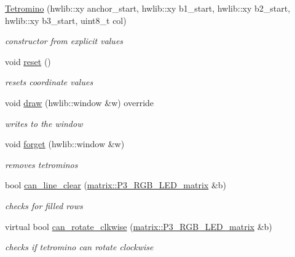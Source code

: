 \begin{DoxyCompactItemize}
\item 
\hyperlink{classtetris_1_1Tetromino_a2fd9a4c170a10eeba329abf374cd3f39}{Tetromino} (hwlib\+::xy anchor\+\_\+start, hwlib\+::xy b1\+\_\+start, hwlib\+::xy b2\+\_\+start, hwlib\+::xy b3\+\_\+start, uint8\+\_\+t col)
\begin{DoxyCompactList}\small\item\em constructor from explicit values \end{DoxyCompactList}\item 
void \hyperlink{classtetris_1_1Tetromino_a36ccceea1c911da05f9a7e7406ecde0a}{reset} ()
\begin{DoxyCompactList}\small\item\em resets coordinate values \end{DoxyCompactList}\item 
void \hyperlink{classtetris_1_1Tetromino_a3dabc26c500e8da90bbfb0347729afc6}{draw} (hwlib\+::window \&w) override
\begin{DoxyCompactList}\small\item\em writes to the window \end{DoxyCompactList}\item 
void \hyperlink{classtetris_1_1Tetromino_a17a79ae9e1d8c7a4041f2f0192923a2b}{forget} (hwlib\+::window \&w)
\begin{DoxyCompactList}\small\item\em removes tetromino\textquotesingle{}s \end{DoxyCompactList}\item 
bool \hyperlink{classtetris_1_1Tetromino_ab2b11138e2d27635d7b7afaaeea58bed}{can\+\_\+line\+\_\+clear} (\hyperlink{classmatrix_1_1P3__RGB__LED__matrix}{matrix\+::\+P3\+\_\+\+R\+G\+B\+\_\+\+L\+E\+D\+\_\+matrix} \&b)
\begin{DoxyCompactList}\small\item\em checks for filled rows \end{DoxyCompactList}\item 
virtual bool \hyperlink{classtetris_1_1Tetromino_a7572a9fba3397bf92dba30f79bec908b}{can\+\_\+rotate\+\_\+clkwise} (\hyperlink{classmatrix_1_1P3__RGB__LED__matrix}{matrix\+::\+P3\+\_\+\+R\+G\+B\+\_\+\+L\+E\+D\+\_\+matrix} \&b)
\begin{DoxyCompactList}\small\item\em checks if tetromino can rotate clockwise \end{DoxyCompactList}\item 

\end{DoxyCompactItemize}
